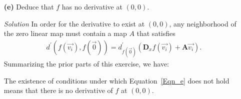 \documentclass[11pt]{article}
\begin{document}
\begin{itemize}
  \newpage
  
\item[\textbf{(e)}] Deduce that $f$ has no derivative at $(0,0)$.
\item[\emph{Solution}] In order for the derivative to exist at $(0,0)$, any
  neighborhood of the zero linear map must contain a map $A$ that satisfies 
  \begin{align}
    d^\prime(f(\vec{v_i}), f(\vec{0})) = d^\prime_{f(\vec{0})}(\mathbf{D}_xf(\vec{v_i}) + \mathbf{A}\vec{v_i}).
    \label{Eqn_e}
  \end{align}
  Summarizing the prior parts of this exercise, we have:
  The existence of conditions under which Equation~\ref{Eqn_e} does not hold means
  that there is no derivative of $f$ at $(0,0)$.

  
\end{itemize}
\end{document}
